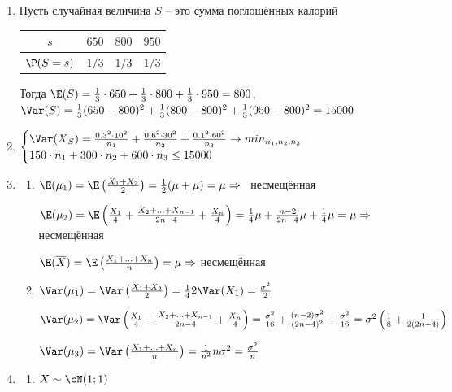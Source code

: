 \begin{enumerate}
\item Пусть случайная величина $S$ – это сумма поглощённых калорий

\begin{tabular}{cccc}
\toprule
$s$ & $650$ & $800$ & $950$ \\ \midrule
$\P(S=s)$ & $1/3$ & $1/3$ & $1/3$ \\ \bottomrule
\end{tabular}

Тогда $\E(S) = \frac{1}{3}\cdot 650 +  \frac{1}{3}\cdot 800 +  \frac{1}{3}\cdot 950 = 800$, $\Var(S) = \frac{1}{3}(650-800)^2 + \frac{1}{3}(800-800)^2 + \frac{1}{3}(950-800)^2 = 15000$

\item
$
\begin{cases}
\Var(\overline{X}_S) = \frac{0.3^2\cdot 10^2}{n_1} + \frac{0.6^2 \cdot 30^2}{n_2} + \frac{0.1^2 \cdot 60^2}{n_3} \to min_{n_1, n_2, n_3} \\
150\cdot n_1 + 300 \cdot n_2 + 600 \cdot n_3 \leq 15000
\end{cases}
$

\item
\begin{enumerate}
\item $\E(\mu_1) = \E\left(\frac{X_1+X_2}{2}\right)  = \frac{1}{2}(\mu+\mu) = \mu \Rightarrow$  несмещённая

$\E(\mu_2) = \E \left(\frac{X_1}{4} + \frac{X_2+\ldots+X_{n-1}}{2n-4} + \frac{X_n}{4}\right) = \frac{1}{4}\mu + \frac{n-2}{2n-4}\mu + \frac{1}{4}\mu = \mu \Rightarrow$ несмещённая

$\E(\overline{X}) = \E\left(\frac{X_1 + \ldots + X_n}{n}\right) = \mu \Rightarrow$ несмещённая

\item $\Var(\mu_1) = \Var\left(\frac{X_1+X_2}{2}\right)  = \frac{1}{4}2\Var(X_1) = \frac{\sigma^2}{2}$

$\Var(\mu_2) = \Var \left(\frac{X_1}{4} + \frac{X_2+\ldots+X_{n-1}}{2n-4} + \frac{X_n}{4}\right)  = \frac{\sigma^2}{16} + \frac{(n-2)\sigma^2}{(2n-4)^2} + \frac{\sigma^2}{16} = \sigma^2\left(\frac{1}{8} + \frac{1}{2(2n-4)} \right)$

$\Var(\mu_3) = \Var\left(\frac{X_1 + \ldots + X_n}{n}\right)  = \frac{1}{n^2}n\sigma^2 = \frac{\sigma^2}{n}$
\end{enumerate}

\item
\begin{enumerate}
\item $X \sim \cN (1;1)$


\end{enumerate}
\end{enumerate}
